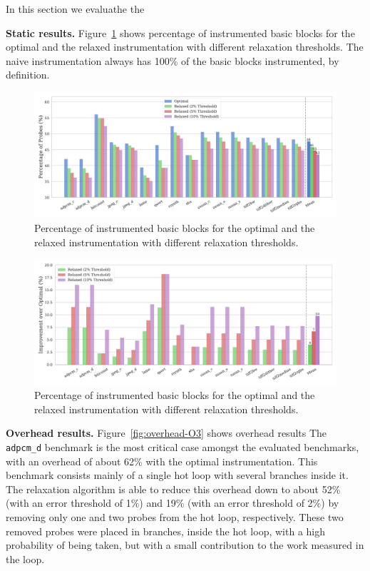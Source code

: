 In this section we evaluathe the 

\textbf{Static results.}
Figure~\ref{fig:num-probes} shows percentage of instrumented basic blocks for the optimal and the relaxed instrumentation with different relaxation thresholds.
The naive instrumentation always has 100\% of the basic blocks instrumented, by definition.

\begin{figure}[ht]
    \centering
    \includegraphics[width=\textwidth]{figs/num-probes.pdf}
    \caption{Percentage of instrumented basic blocks for the optimal and the relaxed instrumentation with different relaxation thresholds.}
    \label{fig:num-probes}
\end{figure}

\begin{figure}[ht]
    \centering
    \includegraphics[width=\textwidth]{figs/num-probes-improvement.pdf}
    \caption{Percentage of instrumented basic blocks for the optimal and the relaxed instrumentation with different relaxation thresholds.}
    \label{fig:num-probes-improvement}
\end{figure}

\textbf{Overhead results.}
Figure~\ref{fig:overhead-O3} shows overhead results 
The \texttt{adpcm\_d} benchmark is the most critical case amongst the evaluated benchmarks, with an overhead of about 62\% with the optimal instrumentation.
This benchmark consists mainly of a single hot loop with several branches inside it.
The relaxation algorithm is able to reduce this overhead down to about 52\% (with an error threshold of 1\%) and 19\% (with an error threshold of 2\%) by removing only one and two probes from the hot loop, respectively.
These two removed probes were placed in branches, inside the hot loop, with a high probability of being taken, but with a small contribution to the work measured in the loop.

